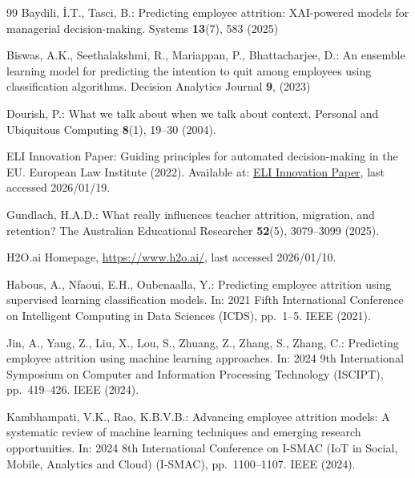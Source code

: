 \documentclass[runningheads]{llncs}
\begin{document}
\begin{thebibliography}{99}
Baydili, \. {I}.T., Tasci, B.: Predicting employee attrition: XAI-powered models for managerial decision-making. Systems \textbf{13}(7), 583 (2025)

Biswas, A.K., Seethalakshmi, R., Mariappan, P., Bhattacharjee, D.: An ensemble learning model for predicting the intention to quit among employees using classification algorithms. Decision Analytics Journal \textbf{9}, (2023)

Dourish, P.: What we talk about when we talk about context. Personal and Ubiquitous Computing \textbf{8}(1), 19--30 (2004). 

ELI Innovation Paper: Guiding principles for automated decision-making in the EU. European Law Institute (2022). Available at: \href{https://www.europeanlawinstitute.eu/fileadmin/user_upload/p_eli/Publications/ELI_Innovation_Paper_on_Guiding_Principles_for_ADM_in_the_EU.pdf}{ELI Innovation Paper}, last accessed 2026/01/19.


Gundlach, H.A.D.: What really influences teacher attrition, migration, and retention? The Australian Educational Researcher \textbf{52}(5), 3079--3099 (2025). 

H2O.ai Homepage, \url{https://www.h2o.ai/}, last accessed 2026/01/10.

Habous, A., Nfaoui, E.H., Oubenaalla, Y.: Predicting employee attrition using supervised learning classification models. In: 2021 Fifth International Conference on Intelligent Computing in Data Sciences (ICDS), pp.~1--5. IEEE (2021). 

Jin, A., Yang, Z., Liu, X., Lou, S., Zhuang, Z., Zhang, S., Zhang, C.: Predicting employee attrition using machine learning approaches. In: 2024 9th International Symposium on Computer and Information Processing Technology (ISCIPT), pp.~419--426. IEEE (2024). 

Kambhampati, V.K., Rao, K.B.V.B.: Advancing employee attrition models: A systematic review of machine learning techniques and emerging research opportunities. In: 2024 8th International Conference on I-SMAC (IoT in Social, Mobile, Analytics and Cloud) (I-SMAC), pp.~1100--1107. IEEE (2024). 


\end{thebibliography}
\end{document}
